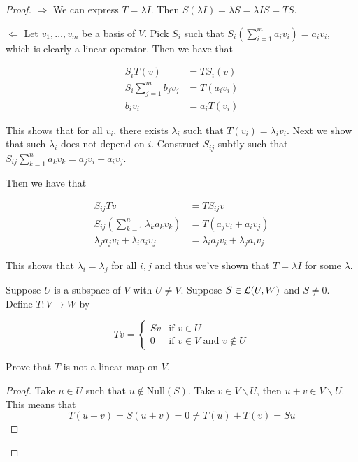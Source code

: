 \documentclass{extarticle}
\begin{document}
\begin{proof}
\(\Rightarrow\) We can express \(T = \lambda I\). Then \(S (\lambda I) = \lambda S = \lambda I S = TS\).

\(\Leftarrow\) Let \(v_1, \ldots, v_m\) be a basis of \(V\). Pick \(S_i\) such that \(S_i (\sum_{i=1}^{m}a_i v_i)
= a_i v_i\), which is clearly a linear operator. Then we have that 

\begin{align*}
    S_i T(v) &= T S_i (v) \\ 
    S_i \sum_{j=1}^{m} b_j v_j & = T(a_i v_i) \\ 
    b_i v_i &= a_i T(v_i)
\end{align*}

This shows that for all \(v_i\), there exists \(\lambda_i\) such that \(T(v_i) = \lambda_i v_i\). Next 
we show that such \(\lambda_i\) does not depend on \(i\). Construct \(S_{ij}\) subtly such that 
\(S_{ij}\sum_{k=1}^{n} a_k v_k = a_j v_i + a_i v_j\). 

Then we have that 

\begin{align*}
    S_{ij} T v &= T S_{ij} v \\ 
    S_{ij} (\sum_{k=1}^{n}\lambda_k a_k v_k) &= T(a_j v_i + a_i v_j) \\ 
    \lambda_j a_j v_i + \lambda_i a_i v_j &= \lambda_i a_j v_i + \lambda_j a_i v_j 
\end{align*}

This shows that \(\lambda_i = \lambda_j\) for all \(i,j\) and thus we've shown that \(T = \lambda I\)
for some \(\lambda\). 

\begin{problem}{12}
    Suppose \(U\) is a subspace of \(V\) with \(U \neq V\). Suppose \(S \in \mathcal{L}(U, W)\)
and \(S \neq 0\). Define \(T \colon V \to W\) by 

\[Tv = \begin{cases}
    Sv & \text{if } v \in U \\ 
    0 & \text{if } v \in V \text{ and } v \notin U 
\end{cases}\]

Prove that \(T\) is not a linear map on \(V\). 
\end{problem}


\begin{proof}
Take \(u \in U\) such that \(u \notin \text{Null}(S)\). Take \(v \in V \backslash U\), then 
\(u + v \in V \backslash U\). This means that 
\[T(u + v) = S(u + v) = 0 \neq T(u) + T(v) = Su\]
\end{proof}


\end{proof}
\end{document}
